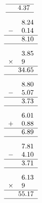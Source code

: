 \documentclass[leqno, 12pt]{article}
\begin{document}
\begin{multicols}{3}
\begin{equation}
{\begin{tabular}{c S[table-format=1.2]}
        \hline
         &4.37 \tabularnewline
        \hline
    \end{tabular}}
\end{equation}
\vspace{-1pt}%
\begin{equation}
    \raisebox{-0.8cm}{
        \begin{tabular}{c S[table-format=1.2]}
         &8.24 \tabularnewline
        $-$&0.14 \tabularnewline
        \hline
         &8.10 \tabularnewline
        \hline
    \end{tabular}}
\end{equation}
\vspace{-1pt}%
\begin{equation}
    \raisebox{-0.8cm}{
        \begin{tabular}{c S[table-format=1.2]}
         &3.85 \tabularnewline
        $\times$&9 \tabularnewline
        \hline
         &34.65 \tabularnewline
        \hline
    \end{tabular}}
\end{equation}
\vspace{-1pt}%
\begin{equation}
    \raisebox{-0.8cm}{
        \begin{tabular}{c S[table-format=1.2]}
         &8.80 \tabularnewline
        $-$&5.07 \tabularnewline
        \hline
         &3.73 \tabularnewline
        \hline
    \end{tabular}}
\end{equation}
\vspace{-1pt}%
\begin{equation}
    \raisebox{-0.8cm}{
        \begin{tabular}{c S[table-format=1.2]}
         &6.01 \tabularnewline
        $+$&0.88 \tabularnewline
        \hline
         &6.89 \tabularnewline
        \hline
    \end{tabular}}
\end{equation}
\vspace{-1pt}%
\begin{equation}
    \raisebox{-0.8cm}{
        \begin{tabular}{c S[table-format=1.2]}
         &7.81 \tabularnewline
        $-$&4.10 \tabularnewline
        \hline
         &3.71 \tabularnewline
        \hline
    \end{tabular}}
\end{equation}
\vspace{-1pt}%
\begin{equation}
    \raisebox{-0.8cm}{
        \begin{tabular}{c S[table-format=1.2]}
         &6.13 \tabularnewline
        $\times$&9 \tabularnewline
        \hline
         &55.17 \tabularnewline
        \hline
    \end{tabular}}
\end{equation}
\vspace{-1pt}
\end{multicols}
\end{document}
